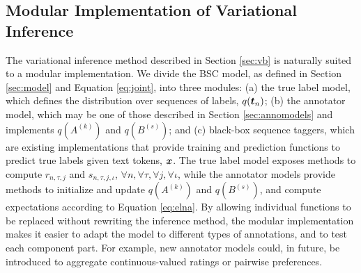 \subsection{Modular Implementation of Variational Inference} \label{seq:modular}
 
The variational inference method described in Section  \ref{sec:vb}
is naturally suited to a modular implementation. We divide the BSC model, 
as defined in Section \ref{sec:model} and Equation \ref{eq:joint}, into 
three modules: 
(a) the true label model, which defines the distribution over sequences of labels, $q(\boldsymbol t_n)$;
(b) the annotator model, which may be one of those described in Section \ref{sec:annomodels} and implements $q(A^{(k)})$ and $q(B^{(s)})$;
and (c) black-box sequence taggers, which
are existing implementations that provide training and prediction functions
to predict true labels given text tokens, $\boldsymbol x$.
The true label model exposes methods to compute 
$r_{n,\tau,j}$ and $s_{n,\tau,j,\iota}$, $\forall n,\forall \tau,\forall j,\forall \iota$,
while the annotator models provide methods to initialize and update $q(A^{(k)})$ and $q(B^{(s)})$,
and compute expectations according to Equation \ref{eq:elna}.
By allowing individual functions to be replaced without rewriting the inference
method, the modular implementation makes it easier to adapt the model to different types of annotations,
and to test each component part.
For example, new annotator models could, in future, be introduced to aggregate 
continuous-valued ratings or pairwise preferences.

